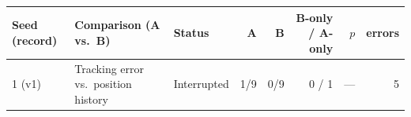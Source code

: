 \begin{tabular}{lllrrrrr}
\toprule
Seed (record) & Comparison (A vs.\ B) & Status & A & B & B-only / A-only & $p$ & errors \\
\midrule
1 (v1) & Tracking error vs.\ position history & Interrupted & 1/9 & 0/9 & 0 / 1 & --- & 5 \\
\bottomrule
\end{tabular}
